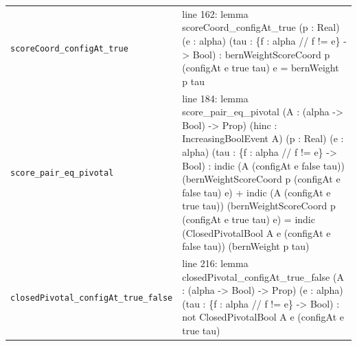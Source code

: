 \documentclass[10pt]{article}
\begin{document}
\begin{longtable}{>{\raggedright\arraybackslash}p{} >{\raggedright\arraybackslash}p{}}
\texttt{scoreCoord\_\allowbreak{}configAt\_\allowbreak{}true} & {\ttfamily\scriptsize line 162:\allowbreak{} lemma scoreCoord\_\allowbreak{}configAt\_\allowbreak{}true (\allowbreak{}p :\allowbreak{} Real)\allowbreak{} (\allowbreak{}e :\allowbreak{} alpha)\allowbreak{} (\allowbreak{}tau :\allowbreak{} \{f :\allowbreak{} alpha /\allowbreak{}/\allowbreak{} f !=\allowbreak{} e\} -\allowbreak{}> Bool)\allowbreak{} :\allowbreak{} bernWeightScoreCoord p (\allowbreak{}configAt e true tau)\allowbreak{} e =\allowbreak{} bernWeight p tau} \\[0.45em]
\texttt{score\_\allowbreak{}pair\_\allowbreak{}eq\_\allowbreak{}pivotal} & {\ttfamily\scriptsize line 184:\allowbreak{} lemma score\_\allowbreak{}pair\_\allowbreak{}eq\_\allowbreak{}pivotal (\allowbreak{}A :\allowbreak{} (\allowbreak{}alpha -\allowbreak{}> Bool)\allowbreak{} -\allowbreak{}> Prop)\allowbreak{} (\allowbreak{}hinc :\allowbreak{} IncreasingBoolEvent A)\allowbreak{} (\allowbreak{}p :\allowbreak{} Real)\allowbreak{} (\allowbreak{}e :\allowbreak{} alpha)\allowbreak{} (\allowbreak{}tau :\allowbreak{} \{f :\allowbreak{} alpha /\allowbreak{}/\allowbreak{} f !=\allowbreak{} e\} -\allowbreak{}> Bool)\allowbreak{} :\allowbreak{} indic (\allowbreak{}A (\allowbreak{}configAt e false tau)\allowbreak{})\allowbreak{} (\allowbreak{}bernWeightScoreCoord p (\allowbreak{}configAt e false tau)\allowbreak{} e)\allowbreak{} +\allowbreak{} indic (\allowbreak{}A (\allowbreak{}configAt e true tau)\allowbreak{})\allowbreak{} (\allowbreak{}bernWeightScoreCoord p (\allowbreak{}configAt e true tau)\allowbreak{} e)\allowbreak{} =\allowbreak{} indic (\allowbreak{}ClosedPivotalBool A e (\allowbreak{}configAt e false tau)\allowbreak{})\allowbreak{} (\allowbreak{}bernWeight p tau)\allowbreak{}} \\[0.45em]
\texttt{closedPivotal\_\allowbreak{}configAt\_\allowbreak{}true\_\allowbreak{}false} & {\ttfamily\scriptsize line 216:\allowbreak{} lemma closedPivotal\_\allowbreak{}configAt\_\allowbreak{}true\_\allowbreak{}false (\allowbreak{}A :\allowbreak{} (\allowbreak{}alpha -\allowbreak{}> Bool)\allowbreak{} -\allowbreak{}> Prop)\allowbreak{} (\allowbreak{}e :\allowbreak{} alpha)\allowbreak{} (\allowbreak{}tau :\allowbreak{} \{f :\allowbreak{} alpha /\allowbreak{}/\allowbreak{} f !=\allowbreak{} e\} -\allowbreak{}> Bool)\allowbreak{} :\allowbreak{} not ClosedPivotalBool A e (\allowbreak{}configAt e true tau)\allowbreak{}} \\[0.45em]

\end{longtable}
\end{document}

